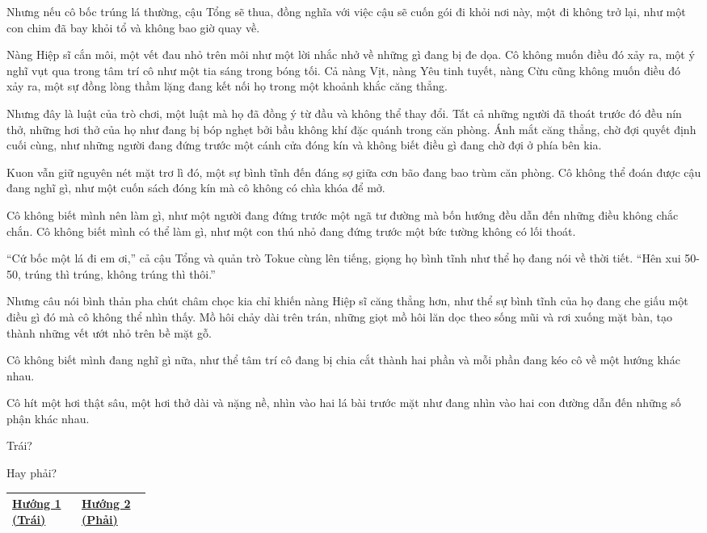 \documentclass[../main.tex]{subfiles}
\begin{document}
Nhưng nếu cô bốc trúng lá thường, cậu Tổng sẽ thua, đồng nghĩa với việc cậu sẽ cuốn gói đi khỏi nơi này, một đi không trở lại, như một con chim đã bay khỏi tổ và không bao giờ quay về.

Nàng Hiệp sĩ cắn môi, một vết đau nhỏ trên môi như một lời nhắc nhở về những gì đang bị đe dọa. Cô không muốn điều đó xảy ra, một ý nghĩ vụt qua trong tâm trí cô như một tia sáng trong bóng tối. Cả nàng Vịt, nàng Yêu tinh tuyết, nàng Cừu cũng không muốn điều đó xảy ra, một sự đồng lòng thầm lặng đang kết nối họ trong một khoảnh khắc căng thẳng.

Nhưng đây là luật của trò chơi, một luật mà họ đã đồng ý từ đầu và không thể thay đổi. Tất cả những người đã thoát trước đó đều nín thở, những hơi thở của họ như đang bị bóp nghẹt bởi bầu không khí đặc quánh trong căn phòng. Ánh mắt căng thẳng, chờ đợi quyết định cuối cùng, như những người đang đứng trước một cánh cửa đóng kín và không biết điều gì đang chờ đợi ở phía bên kia.

Kuon vẫn giữ nguyên nét mặt trơ lì đó, một sự bình tĩnh đến đáng sợ giữa cơn bão đang bao trùm căn phòng. Cô không thể đoán được cậu đang nghĩ gì, như một cuốn sách đóng kín mà cô không có chìa khóa để mở.

Cô không biết mình nên làm gì, như một người đang đứng trước một ngã tư đường mà bốn hướng đều dẫn đến những điều không chắc chắn. Cô không biết mình có thể làm gì, như một con thú nhỏ đang đứng trước một bức tường không có lối thoát.

``Cứ bốc một lá đi em ơi,'' cả cậu Tổng và quản trò Tokue cùng lên tiếng, giọng họ bình tĩnh như thể họ đang nói về thời tiết. ``Hên xui 50-50, trúng thì trúng, không trúng thì thôi.''

Nhưng câu nói bình thản pha chút châm chọc kia chỉ khiến nàng Hiệp sĩ căng thẳng hơn, như thể sự bình tĩnh của họ đang che giấu một điều gì đó mà cô không thể nhìn thấy. Mồ hôi chảy dài trên trán, những giọt mồ hôi lăn dọc theo sống mũi và rơi xuống mặt bàn, tạo thành những vết ướt nhỏ trên bề mặt gỗ.

Cô không biết mình đang nghĩ gì nữa, như thể tâm trí cô đang bị chia cắt thành hai phần và mỗi phần đang kéo cô về một hướng khác nhau.

Cô hít một hơi thật sâu, một hơi thở dài và nặng nề, nhìn vào hai lá bài trước mặt như đang nhìn vào hai con đường dẫn đến những số phận khác nhau.

Trái?

Hay phải?

\begin{table}[H]
  \centering
  \begin{tabular}{|>{\centering\arraybackslash}p{0.1\linewidth}|>{\centering\arraybackslash}p{0.1\linewidth}|} \hline
    \hyperref[cardleft]{Hướng 1 (Trái)} & \hyperref[cardright]{Hướng 2 (Phải)} \\ \hline
  \end{tabular}
  \label{choice}
\end{table}
\end{document}
